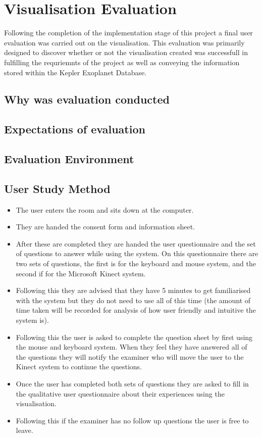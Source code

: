 \chapter{Visualisation Evaluation}\label{C:sd}
Following the completion of the implementation stage of this project a final
user evaluation was carried out on the visualisation. This evaluation was
primarily designed to discover whether or not the visualisation created was
successfull in fulfilling the requriemnts of the project as well as conveying
the information stored within the Kepler Exoplanet Database.

\section{Why was evaluation conducted}

\section{Expectations of evaluation}

\section{Evaluation Environment}

\section{User Study Method}
\begin{itemize}
\item The user enters the room and sits down at the computer.
\item They are handed the consent form and information sheet.
\item After these are completed they are handed the user questionnaire and the
set of questions to answer while using the system. On this questionnaire there
are two sets of questions, the first is for the keyboard and mouse system, and
the second if for the Microsoft Kinect system.
\item Following this they are advised that they have 5 minutes to get
familiarised with the system but they do not need to use all of this time (the
amount of time taken will be recorded for analysis of how user friendly and
intuitive the system is).
\item Following this the user is asked to complete the question sheet by first
using the mouse and keyboard system. When they feel they have answered all of
the questions they will notify the examiner who will move the user to the Kinect
system to continue the questions.
\item Once the user has completed both sets of questions they are asked to fill
in the qualitative user questionnaire about their experiences using the
visualisation. 
\item Following this if the examiner has no follow up questions the user is free
to leave.
\end{itemize}

